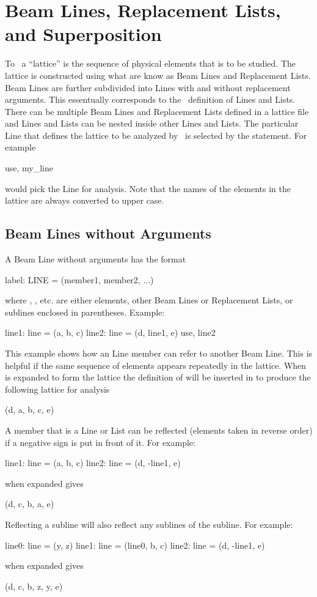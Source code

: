 \chapter{Beam Lines, Replacement Lists, and Superposition}

To \bmad\ a ``lattice'' is the sequence of physical elements that is to
be studied. The lattice is constructed using what are know as Beam Lines
and Replacement Lists. Beam Lines are further subdivided into Lines with
and without replacement arguments. This essentually corresponds to the
\mad\ definition of Lines and Lists. There can be multiple Beam Lines
and Replacement Lists defined in a lattice file and Lines and Lists can
be nested inside other Lines and Lists. The particular Line that defines
the lattice to be analyzed by \bmad\ is selected by the 
statement. For example
\begin{example}
  use, my_line
\end{example}
would pick the Line  for analysis. 
Note that the names of the elements in the
lattice are always converted to upper case.

\section{Beam Lines without Arguments}
A Beam Line without arguments has the format
\begin{example}
  label: LINE = (member1, member2, ...)
\end{example}
where , , etc. are either elements, other Beam
Lines or Replacement Lists, or sublines enclosed in parentheses.
Example:
\begin{example}
  line1: line = (a, b, c)
  line2: line = (d, line1, e)
  use, line2
\end{example}
This example shows how an Line member can refer to another Beam Line.
This is helpful if the same sequence of elements appears repeatedly in
the lattice. When  is expanded to form the lattice the
definition of  will be inserted in to produce the following
lattice for analysis
\begin{example}
  (d, a, b, c, e)
\end{example}

A member that is a Line or List can be reflected 
(elements taken in reverse order) if
a negative sign is put in front of it. For example:
\begin{example}
  line1: line = (a, b, c)
  line2: line = (d, -line1, e)
\end{example}
 when expanded gives
\begin{example}
  (d, c, b, a, e)
\end{example}
Reflecting a subline will also reflect any sublines of the subline. For
example:
\begin{example}
  line0: line = (y, z)
  line1: line = (line0, b, c)
  line2: line = (d, -line1, e)
\end{example}
 when expanded gives
\begin{example}
  (d, c, b, z, y, e)
\end{example}

